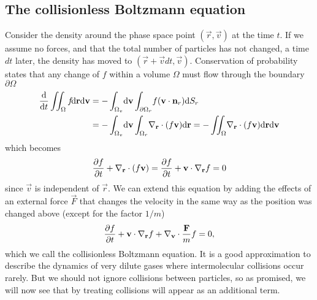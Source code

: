 \subsection{The collisionless Boltzmann equation}
Consider the density around the phase space point $(\vec r,\vec v)$ at the time $t$. If we assume no forces, and that the total number of particles has not changed, a time $dt$ later, the density has moved to $(\vec r + \vec vdt, \vec v)$. Conservation of probability states that any change of $f$ within a volume $\Omega$ must flow through the boundary $\partial \Omega$
\begin{align}
	\frac{\dm }{\dm t}\iint_\Omega f\! \dm \vec r \dm \vec v &= -\int_{\Omega_v}\!\dm \vec v\int_{\partial \Omega_r}\! f(\vec v\cdot \vec n_r) \dm S_r\\
	&= -\int_{\Omega_v}\!\dm \vec v\int_{\Omega_r}\! \nabla_\vec r\cdot(f\vec v) \dm \vec r = -\iint_{\Omega}\! \nabla_\vec r\cdot(f\vec v) \dm \vec r\dm \vec v
\end{align}
which becomes
\begin{align}
	\frac{\partial f}{\partial t} + \nabla_\mathbf r \cdot(f\mathbf v) = \frac{\partial f}{\partial t} + \mathbf v\cdot\nabla_\mathbf r f = 0
\end{align}
since $\vec v$ is independent of $\vec r$. We can extend this equation by adding the effects of an external force $\vec F$ that changes the velocity in the same way as the position was changed above (except for the factor $1/m$)
\begin{align}
	\label{eq:collisionless_boltzmann}
	\frac{\partial f}{\partial t} + \mathbf v\cdot\nabla_\mathbf r f + \nabla_\mathbf v \cdot \frac{\mathbf F}{ m}f = 0,
\end{align}
which we call the collisionless Boltzmann equation. It is a good approximation to describe the dynamics of very dilute gases where intermolecular collisions occur rarely. But we should not ignore collisions between particles, so as promised, we will now see that by treating collisions will appear as an additional term.
